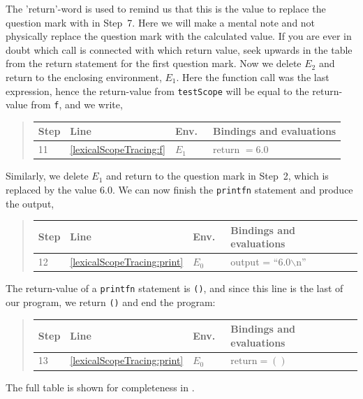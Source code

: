\documentclass[fsharpNotes.tex]{subfiles}
\begin{document}
The 'return'-word is used to remind us that this is the value to replace the question mark with in Step~7. Here we will make a mental note and not physically replace the question mark with the calculated value. If you are ever in doubt which call is connected with which return value, seek upwards in the table from the return statement for the first question mark. Now we delete $E_2$ and return to the enclosing environment, $E_1$. Here the function call was the last expression, hence the return-value from \lstinline{testScope} will be equal to the return-value from \lstinline{f}, and we write,
\begin{quote}
  \begin{tabular*}{0.9\linewidth}{l|lll}
    Step & Line & Env.\ & Bindings and evaluations\\
    \hline
    11 & \ref{lexicalScopeTracing:f} & $E_1$ & return $= 6.0$
  \end{tabular*}
\end{quote}
Similarly, we delete $E_1$ and return to the question mark in Step~2, which is replaced by the value $6.0$. We can now finish the \lstinline{printfn} statement and produce the output,
\begin{quote}
  \begin{tabular*}{0.9\linewidth}{l|lll}
    Step & Line & Env.\ & Bindings and evaluations\\
    \hline
    12 & \ref{lexicalScopeTracing:print} & $E_0$ & output = ``6.0$\backslash$n'' 
  \end{tabular*}
\end{quote}
The return-value of a \lstinline{printfn} statement is \lstinline{()}, and since this line is the last of our program, we return \lstinline{()} and end the program:
\begin{quote}
  \begin{tabular*}{0.9\linewidth}{l|lll}
    Step & Line & Env.\ & Bindings and evaluations\\
    \hline
    13 &\ref{lexicalScopeTracing:print} & $E_0$ & $\text{return} = ()$
  \end{tabular*}
\end{quote}
The full table is shown for completeness in .
\end{document}
